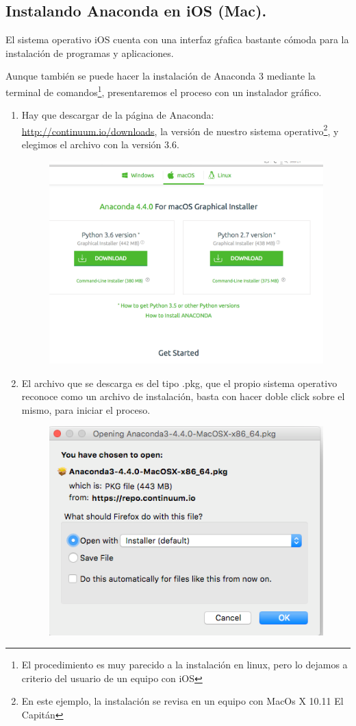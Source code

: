 \documentclass[12pt]{article}
\begin{document}
\subsection{Instalando Anaconda en iOS (Mac).}
El sistema operativo iOS cuenta con una interfaz gŕafica bastante cómoda para la instalación de programas y aplicaciones.
\par
Aunque también se puede hacer la instalación de Anaconda 3 mediante la terminal de comandos\footnote{El procedimiento es muy parecido a la instalación en linux, pero lo dejamos a criterio del usuario de un equipo con iOS}, presentaremos el proceso con un instalador gráfico.
\begin{enumerate}
\item Hay que descargar de la página de Anaconda: \url{http://continuum.io/downloads}, la versión de nuestro sistema operativo\footnote{En este ejemplo, la instalación se revisa en un equipo con MacOs X 10.11 El Capitán}, y elegimos el archivo con la versión 3.6.
\begin{figure}[H]
	\centering
	\includegraphics[scale=0.25]{Imagenes/Instalacion_Anaconda_01_iOS_02} 
\end{figure}
\item El archivo que se descarga es del tipo .pkg, que el propio sistema operativo reconoce como un archivo de instalación, basta con hacer doble click sobre el mismo, para iniciar el proceso.
\begin{figure}[H]
	\centering
	\includegraphics[scale=0.5]{Imagenes/Instalacion_Anaconda_01_iOS_03} 

\end{figure}
\end{enumerate}
\end{document}
